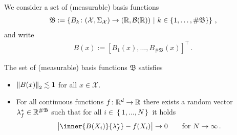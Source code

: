 We consider a set of (measurable) basis functions 
\begin{gather*}
  \mathfrak{B}
  :
  =
  \left\{ 
B_k\colon (\mathcal{X},\Sigma_\mathcal{X})\to(\R,\mathcal{B}(\R))
\ 
|
\ 
k\in \left\{ 1,\ldots,\# \mathfrak{B} \right\}
  \right\}
  \,,
\end{gather*}
and write
\begin{gather*}
  B(x)
  :=
  [B_1(x),\ldots,B_{\# \mathfrak{B}}(x)]^\top
  \,.
\end{gather*}
\begin{assumption}
  \label{asu:basis}
  The set of (measurable) basis functions 
  $
  \mathfrak{B}
  $
  satisfies
  \begin{itemize}
    \item
      $\left\lVert B(x)\right\rVert_2\lesssim 1$ for all $x\in \mathcal{X}$.
    \item
      For all continuous functions $f\colon \mathbb{R}^d\to \mathbb{R}$ there exists a random vector
      $\lambda^*_{f}\in\mathbb{R}^{\#\mathfrak{B}}$ such that
      for all $i\in \left\{ 1,\ldots, N \right\}$ it holds
      \begin{gather*}
        \left| 
        \inner{B(X_i)}{\lambda^*_f}
        -
        f(X_i)
        \right|
        \to 
        0
        \qquad
        \text{for}
        \ 
        N\to\infty
        \,.
      \end{gather*}
  \end{itemize}
\end{assumption}

